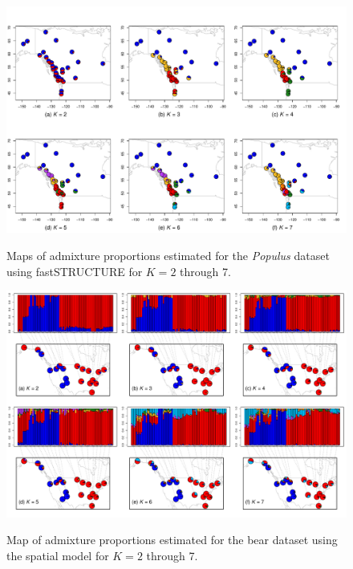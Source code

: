 \documentclass[10pt,letterpaper]{article}
\begin{document}
\begin{figure}
	\centering
		{\includegraphics[width=\textwidth]{figs/populus/poplar_fastStr_results.pdf}}
	\caption{
	Maps of admixture proportions estimated for the \textit{Populus} dataset 
	using fastSTRUCTURE \cite{fastStructure} for $K=2$ through 7.
    }\label{populus_fastStr}
\end{figure}
\clearpage

\begin{figure}
	\centering
		{\includegraphics[width=\textwidth]{figs/bears/bear_sp_results.pdf}}
	\caption{
	Map of admixture proportions estimated for the bear dataset 
	using the spatial model for $K=2$ through 7.
    }\label{bear_sp_pies}
\end{figure}
\clearpage
\end{document}
